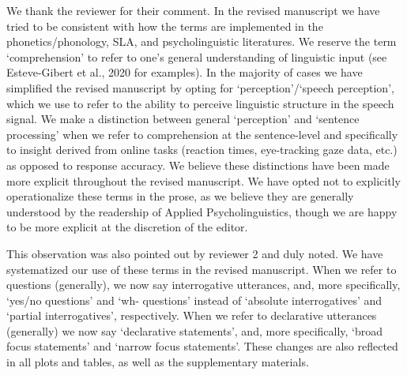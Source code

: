 \documentclass[]{article}
\newcommand{\TaskEstimationBox}[2]{%
\ifoptiondraft{\parbox{1.0\linewidth}{\hfill \hfill {\colorbox{#2}{\color{White} \textbf{#1}}}}}%
{}%
}
\def\Done {\TaskEstimationBox{Done}{Blue}}
\def\Easy {\TaskEstimationBox{Feasible}{ForestGreen}}
\begin{document}

We thank the reviewer for their comment.
In the revised manuscript we have tried to be consistent with how the terms are implemented in the phonetics/phonology, SLA, and psycholinguistic literatures.
We reserve the term `comprehension' to refer to one's general understanding of linguistic input (see Esteve-Gibert et al., 2020 for examples).
In the majority of cases we have simplified the revised manuscript by opting for `perception'/`speech perception', which we use to refer to the ability to perceive linguistic structure in the speech signal.
We make a distinction between general `perception' and `sentence processing' when we refer to comprehension at the sentence-level and specifically to insight derived from online tasks (reaction times, eye-tracking gaze data, etc.) as opposed to response accuracy.
We believe these distinctions have been made more explicit throughout the revised manuscript.
We have opted not to explicitly operationalize these terms in the prose, as we believe they are generally understood by the readership of Applied Psycholinguistics, though we are happy to be more explicit at the discretion of the editor.

\Done
\Easy


This observation was also pointed out by reviewer 2 and duly noted.
We have systematized our use of these terms in the revised manuscript.
When we refer to questions (generally), we now say interrogative utterances, and, more specifically, `yes/no questions' and `wh- questions' instead of `absolute interrogatives' and `partial interrogatives', respectively.
When we refer to declarative utterances (generally) we now say `declarative statements', and, more specifically, `broad focus statements' and `narrow focus statements'.
These changes are also reflected in all plots and tables, as well as the supplementary materials.
\end{document}
